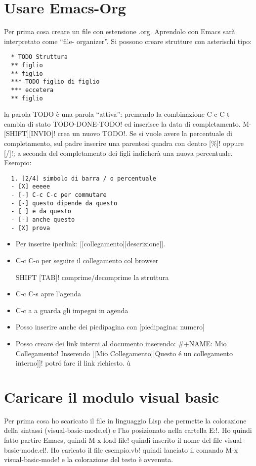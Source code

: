 \documentclass{article}
\begin{document}
\section{Usare Emacs-Org}
Per prima cosa creare un file con estensione .org. Aprendolo con Emacs sarà interpretato come ``file- organizer''. Si possono creare strutture con asterischi tipo:

\begin{verbatim}
  * TODO Struttura
  ** figlio
  ** figlio
  *** TODO figlio di figlio
  *** eccetera
  ** figlio
\end{verbatim}

la parola TODO è una parola ``attiva'': premendo la combinazione C-c C-t cambia di stato TODO-DONE-TODO! ed inserisce la data di completamento. M-[SHIFT][INVIO]! crea un nuovo TODO!. Se si vuole avere la percentuale di completamento, sul padre inserire una parentesi quadra con dentro [\%]! oppure [/]!; a seconda del completamento dei figli indicherà una nuova percentuale. Esempio:

\begin{verbatim}
  1. [2/4] simbolo di barra / o percentuale
  - [X] eeeee
  - [-] C-c C-c per commutare
  - [-] questo dipende da questo
  - [ ] e da questo
  - [-] anche questo
  - [X] prova
\end{verbatim}

\begin{itemize}[noitemsep,nolistsep]
\item Per inserire iperlink: [[collegamento][descrizione]].
\item C-c C-o per seguire il collegamento col browser
\item [SHIFT][TAB]! comprime/decomprime la struttura
\item C-c C-s apre l'agenda 
\item C-c a a guarda gli impegni in agenda
\item Posso inserire anche dei piedipagina con [piedipagina: numero]
\item Posso creare dei link interni al documento inserendo: #+NAME: Mio Collegamento! Inserendo [[Mio Collegamento][Questo \'e un collegamento interno]]! potr\'o fare il link richiesto.
ù\end{itemize}

\section{Caricare il modulo visual basic}
Per prima cosa ho scaricato il file in linguaggio Lisp che permette la colorazione della sintassi (visual-basic-mode.el) e l'ho posizionato nella cartella E:\Programmi\emacs\bin!. Ho quindi fatto partire Emacs, quindi M-x load-file! quindi inserito il nome del file visual-basic-mode.el!. Ho caricato il file esempio.vb! quindi lanciato il comando M-x visual-basic-mode! e la colorazione del testo è avvenuta.
\end{document}
